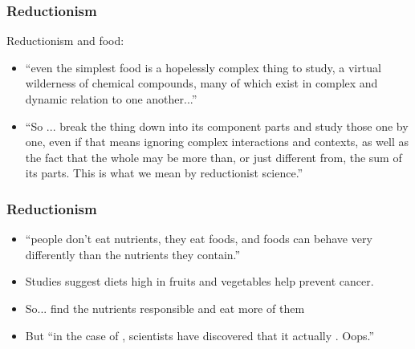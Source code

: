 \begin{frame}
  \frametitle{Reductionism}

  \begin{block}{Reductionism and food:}
    \begin{itemize}
    \item<2-> 
      ``even the simplest food is a
      hopelessly complex thing to study, a virtual wilderness of chemical
      compounds, many of which exist in complex and dynamic relation to one
      another...''
    \item<3->
      ``So ... break the
      thing down into its component parts and study those one by one, even
      if that means ignoring complex interactions and contexts, as well as
      the fact that the whole may be more than, or just different from, the
      sum of its parts. This is what we mean by reductionist science.''
    \end{itemize}
  \end{block}

\end{frame}

\begin{frame}
  \frametitle{Reductionism}

  \begin{block}{}
  \begin{itemize}
  \item<1-> ``people don't eat nutrients, they eat foods, and foods can behave
    very differently than the nutrients they contain.''
  \item<2-> Studies suggest diets high in fruits and vegetables help prevent cancer.
  \item<3-> So...  find the nutrients responsible and eat more of them
  \item<4-> But ``in the case of , scientists have discovered that it
    actually . Oops.''
  \end{itemize}
  \end{block}

\end{frame}


